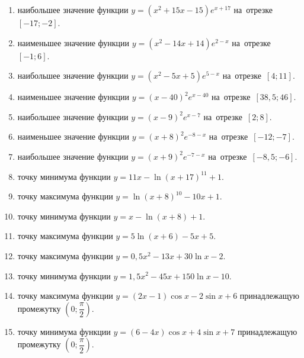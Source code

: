 \documentclass[a4paper,10pt]{article}
\begin{document}
\begin{enumerate}
\item {} наибольшее значение функции $y=\left(x^2 +15x -15\right)e^{x+17}$ на~отрезке~$\left[-17;-2\right]$.

\item {} наименьшее значение функции $y=\left(x^2 -14x +14\right)e^{2-x}$ на~отрезке~$\left[-1;6\right]$.

\item {} наибольшее значение функции $y=\left(x^2 -5x +5\right)e^{5-x}$ на~отрезке~$\left[4;11\right]$.

\item {} наименьшее значение функции $y=\left(x-40\right)^2e^{x-40}$ на~отрезке~$\left[38,5;46\right]$.

\item {} наибольшее значение функции $y=\left(x-9\right)^2e^{x-7}$ на~отрезке~$\left[2;8\right]$.

\item {} наименьшее значение функции $y=\left(x+8\right)^2e^{-8-x}$ на~отрезке~$\left[-12;-7\right]$.

\item {} наибольшее значение функции $y=\left(x+9\right)^2e^{-7-x}$ на~отрезке~$\left[-8,5;-6\right]$.

\item {} точку минимума функции $y=11x-\ln\left(x+17\right)^{11}+1$.

\item {} точку максимума функции $y=\ln\left(x+8\right)^{10}-10x+1$.

\item {} точку минимума функции $y=x-\ln\left(x+8\right)+1$.

\item {} точку максимума функции $y=5\ln\left(x+6\right)-5x+5$.

\item {} точку максимума функции $y=0,5x^2-13x+30\ln x -2$.

\item {} точку минимума функции $y=1,5x^2-45x+150\ln x -10$.

\item {} точку максимума функции $y=\left(2x-1\right)\cos x -2\sin x+6$
принадлежащую промежутку $\left(0;\dfrac{\pi}{2}\right)$.

\item {} точку минимума функции $y=\left(6-4x\right)\cos x +4\sin x+7$
принадлежащую промежутку $\left(0;\dfrac{\pi}{2}\right)$.


\end{enumerate}
\end{document}
